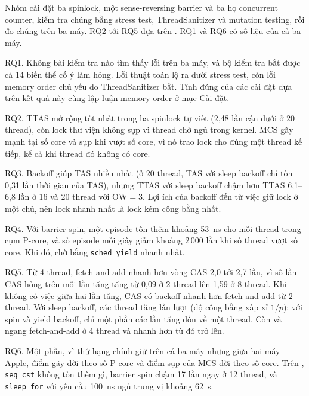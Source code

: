 
Nhóm cài đặt ba spinlock, một sense-reversing barrier và ba họ concurrent counter, kiểm tra chúng bằng
stress test, ThreadSanitizer và mutation testing, rồi đo chúng trên ba máy. RQ2 tới RQ5 dựa trên
. RQ1 và RQ6 có số liệu của cả ba máy.

RQ1. Không bài kiểm tra nào tìm thấy lỗi trên ba máy, và bộ kiểm tra bắt được cả 14 biến thể cố ý làm
hỏng. Lỗi thuật toán lộ ra dưới stress test, còn lỗi memory order chủ yếu do ThreadSanitizer bắt.
Tính đúng của các cài đặt dựa trên kết quả này cùng lập luận memory order ở mục Cài đặt.

RQ2. TTAS mở rộng tốt nhất trong ba spinlock tự viết (2,48 lần cận dưới ở 20 thread), còn lock thư viện
không sụp vì thread chờ ngủ trong kernel. MCS gãy mạnh tại số core và sụp khi vượt số core, vì nó trao
lock cho đúng một thread kế tiếp, kể cả khi thread đó không có core.

RQ3. Backoff giúp TAS nhiều nhất (ở 20 thread, TAS với sleep backoff chỉ tốn 0,31 lần thời gian của
TAS), nhưng TTAS với sleep backoff chậm hơn TTAS 6,1--6,8 lần ở 16 và 20 thread với
$\mathrm{OW} = 3$. Lợi ích của backoff
đến từ việc giữ lock ở một chủ, nên lock nhanh nhất là lock kém công bằng nhất.

RQ4. Với barrier spin, một episode tốn thêm khoảng 53~ns cho mỗi thread trong cụm P-core, và số episode
mỗi giây giảm khoảng 2\,000 lần khi số thread vượt số core. Khi đó, chờ bằng \texttt{sched\_yield}
nhanh nhất.

RQ5. Từ 4 thread, fetch-and-add nhanh hơn vòng CAS 2,0 tới 2,7 lần, vì số lần CAS hỏng trên mỗi lần
tăng tăng từ 0,09 ở 2 thread lên 1,59 ở 8 thread. Khi không có việc giữa hai lần tăng, CAS có backoff
nhanh hơn fetch-and-add từ 2 thread. Với sleep backoff, các thread tăng lần lượt (độ công bằng xấp xỉ
$1/p$); với spin và yield backoff, chỉ một phần các lần tăng dồn về một thread. Còn  và
 ngang fetch-and-add ở 4 thread và nhanh hơn từ đó trở lên.

RQ6. Một phần, vì thứ hạng chính giữ trên cả ba máy nhưng giữa hai máy Apple, điểm gãy dời theo số
P-core và điểm sụp của MCS dời theo số core. Trên , \texttt{seq\_cst} không tốn thêm
gì, barrier spin chậm 17 lần ngay ở 12 thread, và \texttt{sleep\_for} với yêu cầu 100~ns ngủ trung vị
khoảng 62~\textmu s.

